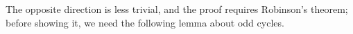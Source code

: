 \documentclass[a4paper,12pt,oneside]{book}
\newtheorem{lemma}[theorem]{Lemma}
\newcommand*{\QED}{\hfill\ensuremath{\square}}
\begin{document}
The opposite direction is less trivial, and the proof requires  Robinson's theorem; before showing it, we need the following lemma about odd cycles.

%
%
\end{document}
